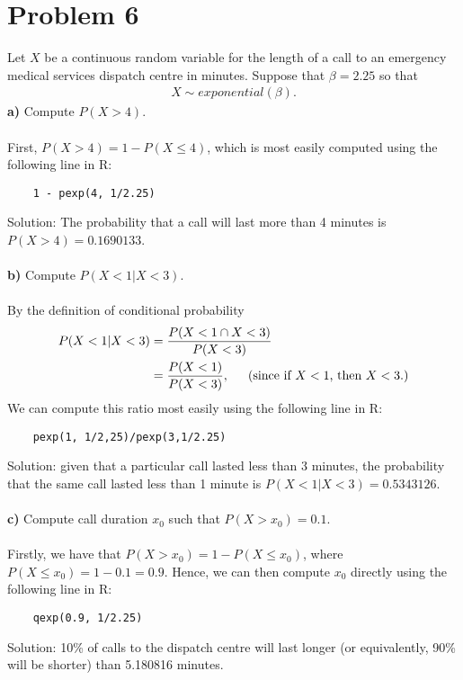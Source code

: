 \documentclass[11pt, letterpaper]{article}
\begin{document}
\section*{Problem 6}
Let $X$ be a continuous random variable for the length of a call to an emergency medical services
dispatch centre in minutes. Suppose that $\beta=2.25$ so that
\begin{align*}
    X\sim exponential(\beta).
\end{align*}
{\bf a)} Compute $P(X>4)$.\\\\
First, $P(X>4)=1-P(X\leq 4)$, which is most easily computed using the following line in R:
\begin{verbatim}
    1 - pexp(4, 1/2.25)
\end{verbatim}
Solution: The probability that a call will last more than 4 minutes is $P(X>4)=0.1690133$.\\\\
{\bf b)} Compute $P(X<1|X<3)$.\\\\
By the definition of conditional probability
\begin{align*}
    P(X<1|X<3)&=\frac{P(X<1\cap X<3)}{P(X<3)}\\
    &=\frac{P(X<1)}{P(X<3)},\text{\indent (since if $X<1$, then $X<3$.)}
\end{align*}
We can compute this ratio most easily using the following line in R:
\begin{verbatim}
    pexp(1, 1/2,25)/pexp(3,1/2.25)
\end{verbatim}
Solution: given that a particular call lasted less than 3 minutes, the probability that the same call
lasted less than 1 minute is $P(X<1|X<3)=0.5343126$.\\\\
{\bf c)} Compute call duration $x_0$ such that $P(X>x_0)=0.1$.\\\\
Firstly, we have that $P(X>x_0)=1-P(X\leq x_0)$, where $P(X\leq x_0)=1-0.1=0.9$. Hence, we can then 
compute $x_0$ directly using the following line in R:
\begin{verbatim}
    qexp(0.9, 1/2.25)
\end{verbatim}
Solution: 10\% of calls to the dispatch centre will last longer (or equivalently, 90\% will be shorter) 
than 5.180816 minutes.
\end{document}
